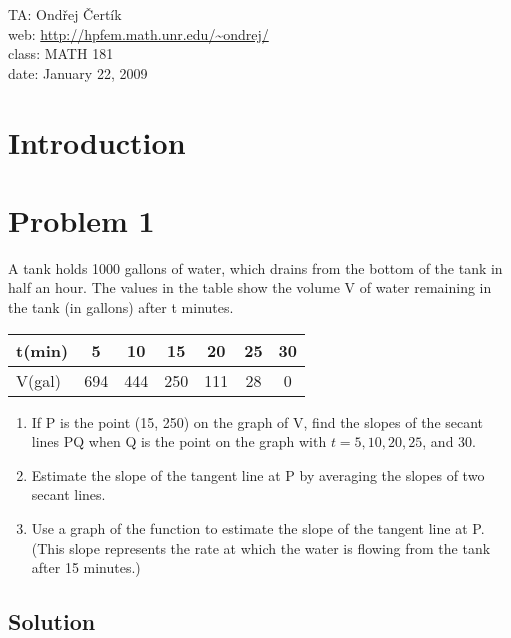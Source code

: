 \documentclass[10pt]{article}
\begin{document}
\noindent TA: Ondřej Čertík\\
web: \url{http://hpfem.math.unr.edu/~ondrej/}\\
class: MATH 181\\
date: January 22, 2009

\section{Introduction}

\section{Problem 1}

A tank holds 1000 gallons of water, which drains from the bottom of the tank in
half an hour. The values in the table show the volume V of water remaining in
the tank (in gallons) after t minutes.

\begin{tabular}{|l||c|c|c|c|c|c|}
\hline
t(min) & 5   & 10  & 15  & 20  & 25 & 30 \\ \hline
V(gal) & 694 & 444 & 250 & 111 & 28 & 0 \\
\hline
\end{tabular}

\renewcommand{\labelenumi}{(\alph{enumi})}
\renewcommand{\labelenumii}{(\roman{enumii})}
\begin{enumerate}
\item If P is the point (15, 250) on the graph of V, find the
slopes of the secant lines PQ when Q is the point on the
graph with $t = 5, 10, 20, 25$, and 30.

\item Estimate the slope of the tangent line at P by averaging
the slopes of two secant lines.

\item Use a graph of the function to estimate the slope of the tangent line at
P.  (This slope represents the rate at which the water is flowing from the tank
after 15 minutes.)
\end{enumerate}

\subsection*{Solution}
\end{document}

